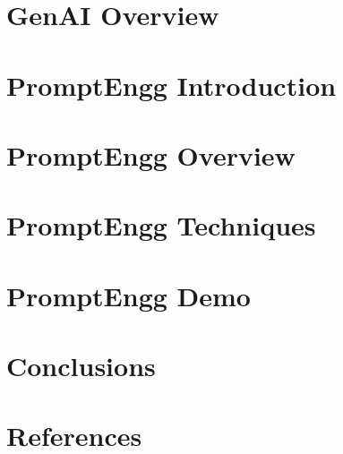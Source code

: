 \section[GenAI]{GenAI Overview}


\section[Intro]{PromptEngg Introduction}


\section[PromptEngg]{PromptEngg Overview}


\section[Techniques]{PromptEngg Techniques}



\section[Demo]{PromptEngg Demo}


\section[Concl]{Conclusions}


\section[Refs]{References}
